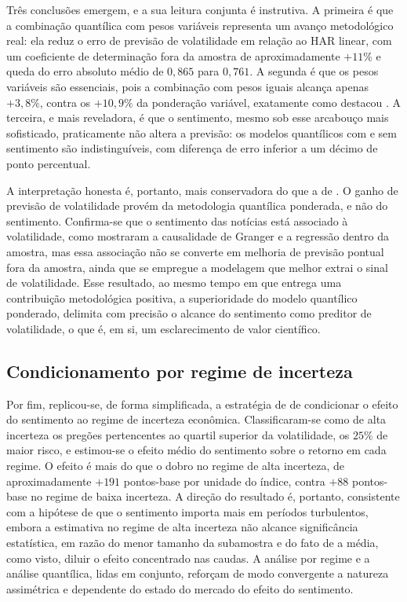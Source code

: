 Três conclusões emergem, e a sua leitura conjunta é instrutiva. A primeira é que a combinação quantílica com pesos variáveis representa um avanço metodológico real: ela reduz o erro de previsão de volatilidade em relação ao HAR linear, com um coeficiente de determinação fora da amostra de aproximadamente $+11\%$ e queda do erro absoluto médio de $0{,}865$ para $0{,}761$. A segunda é que os pesos variáveis são essenciais, pois a combinação com pesos iguais alcança apenas $+3{,}8\%$, contra os $+10{,}9\%$ da ponderação variável, exatamente como destacou . A terceira, e mais reveladora, é que o sentimento, mesmo sob esse arcabouço mais sofisticado, praticamente não altera a previsão: os modelos quantílicos com e sem sentimento são indistinguíveis, com diferença de erro inferior a um décimo de ponto percentual.

A interpretação honesta é, portanto, mais conservadora do que a de . O ganho de previsão de volatilidade provém da metodologia quantílica ponderada, e não do sentimento. Confirma-se que o sentimento das notícias está associado à volatilidade, como mostraram a causalidade de Granger e a regressão dentro da amostra, mas essa associação não se converte em melhoria de previsão pontual fora da amostra, ainda que se empregue a modelagem que melhor extrai o sinal de volatilidade. Esse resultado, ao mesmo tempo em que entrega uma contribuição metodológica positiva, a superioridade do modelo quantílico ponderado, delimita com precisão o alcance do sentimento como preditor de volatilidade, o que é, em si, um esclarecimento de valor científico.

\subsection{Condicionamento por regime de incerteza}

Por fim, replicou-se, de forma simplificada, a estratégia de  de condicionar o efeito do sentimento ao regime de incerteza econômica. Classificaram-se como de alta incerteza os pregões pertencentes ao quartil superior da volatilidade, os $25\%$ de maior risco, e estimou-se o efeito médio do sentimento sobre o retorno em cada regime. O efeito é mais do que o dobro no regime de alta incerteza, de aproximadamente $+191$ pontos-base por unidade do índice, contra $+88$ pontos-base no regime de baixa incerteza. A direção do resultado é, portanto, consistente com a hipótese de que o sentimento importa mais em períodos turbulentos, embora a estimativa no regime de alta incerteza não alcance significância estatística, em razão do menor tamanho da subamostra e do fato de a média, como visto, diluir o efeito concentrado nas caudas. A análise por regime e a análise quantílica, lidas em conjunto, reforçam de modo convergente a natureza assimétrica e dependente do estado do mercado do efeito do sentimento.

